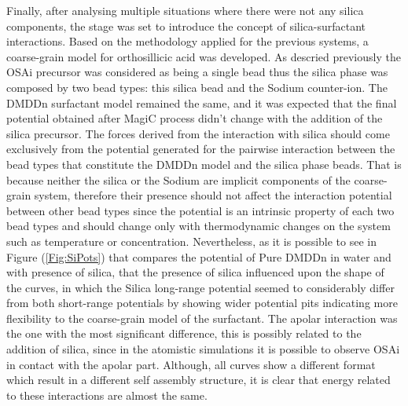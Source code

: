 \documentclass[10pt,a4paper,twoside]{article}
\begin{document}
Finally, after analysing multiple situations where there were not any silica components, the stage was set to introduce the concept of silica-surfactant interactions. Based on the methodology applied for the previous systems, a coarse-grain model for orthosillicic acid was developed. As descried previously the OSAi precursor was considered as being a single bead thus the silica phase was composed by two bead types: this silica bead and the Sodium counter-ion. The DMDDn surfactant model remained the same, and it was expected that the final potential obtained after MagiC process didn't change with the addition of the silica precursor. The forces derived from the interaction with silica should come exclusively from the potential generated for the pairwise interaction between the bead types that constitute the DMDDn model and the silica phase beads. That is because neither the silica or the Sodium are implicit components of the coarse-grain system, therefore their presence should not affect the interaction potential between other bead types since the potential is an intrinsic property of each two bead types and should change only with thermodynamic changes on the system such as temperature or concentration. Nevertheless, as it is possible to see in Figure (\ref{Fig:SiPots}) that compares the potential of Pure DMDDn in water and with presence of silica, that the presence of silica influenced upon the shape of the curves, in which the Silica long-range potential seemed to considerably differ from both short-range potentials by showing wider potential pits indicating more flexibility to the coarse-grain model of the surfactant. The apolar interaction was the one with the most significant difference, this is possibly related to the addition of silica, since in the atomistic simulations it is possible to observe OSAi in contact with the apolar part. Although, all curves show a different format which result in a different self assembly structure, it is clear that energy related to these interactions are almost the same. 
\end{document}
